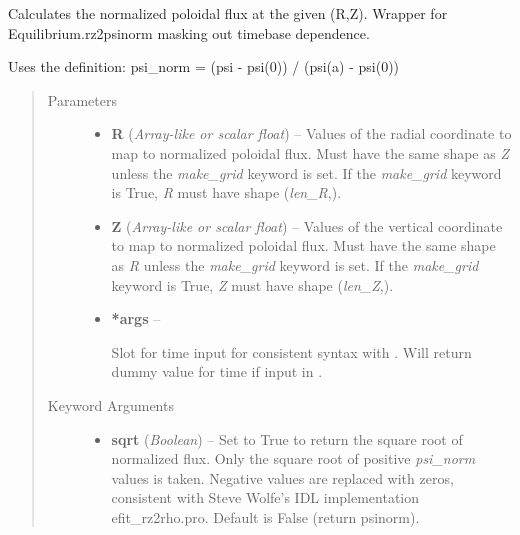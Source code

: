\documentclass[letterpaper,10pt,english]{sphinxmanual}
\begin{document}
\begin{fulllineitems}
\begin{fulllineitems}
\end{fulllineitems}


\begin{fulllineitems}
\label{eqtools:eqtools.eqdskreader.EqdskReader.rz2psinorm}
Calculates the normalized poloidal flux at the given (R,Z).
Wrapper for Equilibrium.rz2psinorm masking out timebase dependence.

Uses the definition:
psi\_norm = (psi - psi(0)) / (psi(a) - psi(0))
\begin{quote}\begin{description}
\item[{Parameters}] \leavevmode\begin{itemize}
\item {} 
\textbf{R} (\emph{Array-like or scalar float}) --
Values of the radial coordinate to
map to normalized poloidal flux.  Must have the same shape as
\emph{Z} unless the \emph{make\_grid} keyword is set. If the \emph{make\_grid}
keyword is True, \emph{R} must have shape (\emph{len\_R},).

\item {} 
\textbf{Z} (\emph{Array-like or scalar float}) --
Values of the vertical coordinate to
map to normalized poloidal flux.  Must have the same shape as
\emph{R} unless the \emph{make\_grid} keyword is set. If the \emph{make\_grid}
keyword is True, \emph{Z} must have shape (\emph{len\_Z},).

\item {} 
\textbf{*args} --

Slot for time input for consistent syntax with
.  Will return dummy value for
time if input in {\hyperref[eqtools:eqtools.eqdskreader.EqdskReader]{}}.

\end{itemize}

\item[{Keyword Arguments}] \leavevmode\begin{itemize}
\item {} 
\textbf{sqrt} (\emph{Boolean}) --
Set to True to return the square root of normalized
flux. Only the square root of positive \emph{psi\_norm} values is
taken. Negative values are replaced with zeros, consistent with
Steve Wolfe's IDL implementation efit\_rz2rho.pro. Default is
False (return psinorm).


\end{itemize}
\end{description}
\end{quote}
\end{fulllineitems}
\end{fulllineitems}
\end{document}
